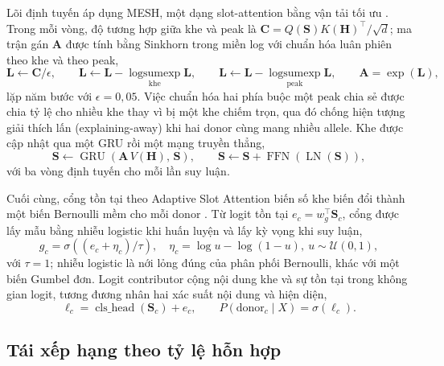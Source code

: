 \documentclass[12pt,a4paper]{article}
\begin{document}
Lõi định tuyến áp dụng MESH, một dạng slot-attention bằng vận tải tối ưu \cite{zhang2023mesh}. Trong mỗi vòng, độ tương hợp giữa khe và peak là \(\bm{C}=Q(\bm{S})K(\mathbf{H})^\top/\sqrt{d}\); ma trận gán \(\bm{A}\) được tính bằng Sinkhorn trong miền log với chuẩn hóa luân phiên theo khe và theo peak,
\begin{equation}
\bm{L}\leftarrow\bm{C}/\epsilon,\qquad
\bm{L}\leftarrow\bm{L}-\operatorname*{logsumexp}_{\text{khe}}\bm{L},\qquad
\bm{L}\leftarrow\bm{L}-\operatorname*{logsumexp}_{\text{peak}}\bm{L},\qquad
\bm{A}=\exp(\bm{L}),
\end{equation}
lặp năm bước với \(\epsilon=0{,}05\). Việc chuẩn hóa hai phía buộc một peak chia sẻ được chia tỷ lệ cho nhiều khe thay vì bị một khe chiếm trọn, qua đó chống hiện tượng giải thích lấn (explaining-away) khi hai donor cùng mang nhiều allele. Khe được cập nhật qua một GRU rồi một mạng truyền thẳng,
\begin{equation}
\bm{S}\leftarrow\operatorname{GRU}\!\left(\bm{A}\,V(\mathbf{H}),\,\bm{S}\right),
\qquad
\bm{S}\leftarrow\bm{S}+\operatorname{FFN}(\operatorname{LN}(\bm{S})),
\end{equation}
với ba vòng định tuyến cho mỗi lần suy luận.

Cuối cùng, cổng tồn tại theo Adaptive Slot Attention biến số khe biến đổi thành một biến Bernoulli mềm cho mỗi donor \cite{fan2024adaslot}. Từ logit tồn tại \(e_c=w_g^\top\bm{S}_c\), cổng được lấy mẫu bằng nhiễu logistic khi huấn luyện và lấy kỳ vọng khi suy luận,
\begin{equation}
g_c=\sigma\!\left((e_c+\eta_c)/\tau\right),\quad \eta_c=\log u-\log(1-u),\ u\sim\mathcal{U}(0,1),
\end{equation}
với \(\tau=1\); nhiễu logistic là nới lỏng đúng của phân phối Bernoulli, khác với một biến Gumbel đơn. Logit contributor cộng nội dung khe và sự tồn tại trong không gian logit, tương đương nhân hai xác suất nội dung và hiện diện,
\begin{equation}
\ell_c=\operatorname{cls\_head}(\bm{S}_c)+e_c,
\qquad P(\mathrm{donor}_c\mid X)=\sigma(\ell_c).
\end{equation}

\subsection{Tái xếp hạng theo tỷ lệ hỗn hợp}
\end{document}
